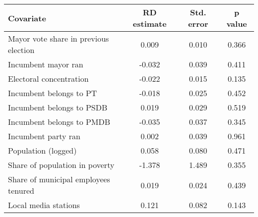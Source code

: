 \begin{tabular}{lccc}
  \hline
Covariate & RD estimate & Std. error & p value \\ 
  \hline
Mayor vote share in previous election & 0.009 & 0.010 & 0.366 \\ 
  Incumbent mayor ran & -0.032 & 0.039 & 0.411 \\ 
  Electoral concentration & -0.022 & 0.015 & 0.135 \\ 
  Incumbent belongs to PT & -0.018 & 0.025 & 0.452 \\ 
  Incumbent belongs to PSDB & 0.019 & 0.029 & 0.519 \\ 
  Incumbent belongs to PMDB & -0.035 & 0.037 & 0.345 \\ 
  Incumbent party ran & 0.002 & 0.039 & 0.961 \\ 
  Population (logged) & 0.058 & 0.080 & 0.471 \\ 
  Share of population in poverty & -1.378 & 1.489 & 0.355 \\ 
  Share of municipal employees tenured & 0.019 & 0.024 & 0.439 \\ 
  Local media stations & 0.121 & 0.082 & 0.143 \\ 
   \hline
\end{tabular}
